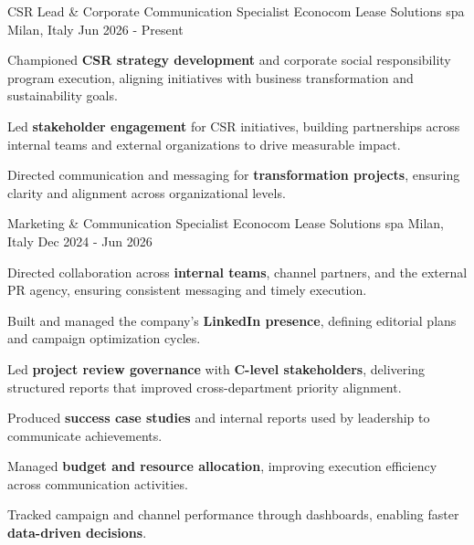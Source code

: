 
\begin{cventries}

\cventry
{CSR Lead \& Corporate Communication Specialist} %
{Econocom Lease Solutions spa} %
{Milan, Italy} %
{Jun 2026 - Present} %
{
\begin{cvitems}
\item Championed \textbf{CSR strategy development} and corporate social responsibility program execution, aligning initiatives with business transformation and sustainability goals.
\item Led \textbf{stakeholder engagement} for CSR initiatives, building partnerships across internal teams and external organizations to drive measurable impact.
\item Directed communication and messaging for \textbf{transformation projects}, ensuring clarity and alignment across organizational levels.
\end{cvitems}
}

\cventry
{Marketing \& Communication Specialist} %
{Econocom Lease Solutions spa} %
{Milan, Italy} %
{Dec 2024 - Jun 2026} %
{
\begin{cvitems}
\item Directed collaboration across \textbf{internal teams}, channel partners, and the external PR agency, ensuring consistent messaging and timely execution.
\item Built and managed the company's \textbf{LinkedIn presence}, defining editorial plans and campaign optimization cycles.
\item Led \textbf{project review governance} with \textbf{C-level stakeholders}, delivering structured reports that improved cross-department priority alignment.
\item Produced \textbf{success case studies} and internal reports used by leadership to communicate achievements.
\item Managed \textbf{budget and resource allocation}, improving execution efficiency across communication activities.
\item Tracked campaign and channel performance through dashboards, enabling faster \textbf{data-driven decisions}.
\end{cvitems}
}


\end{cventries}
